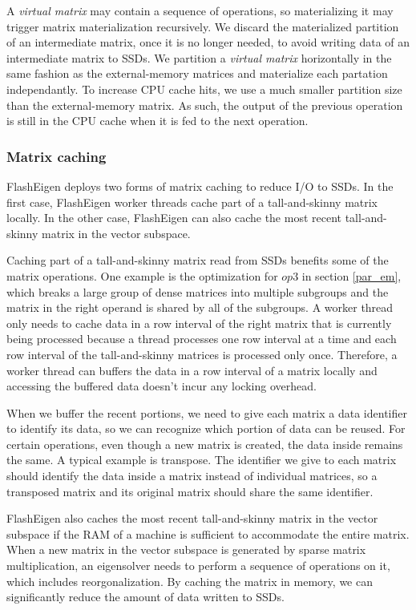 A \textit{virtual matrix} may contain a sequence of operations, so materializing
it may trigger matrix materialization recursively. We discard the materialized
partition of an intermediate matrix, once it is no longer needed, to avoid
writing data of an intermediate matrix to SSDs.
We partition a \textit{virtual matrix} horizontally in the same fashion as
the external-memory matrices and materialize each partation independantly. 
To increase CPU cache hits, we use a much smaller partition size than
the external-memory matrix. As such, the output of the previous operation is
still in the CPU cache when it is fed to the next operation.

\subsubsection{Matrix caching}
FlashEigen deploys two forms of matrix caching to reduce I/O to SSDs.
In the first case, FlashEigen worker threads cache part of a tall-and-skinny
matrix locally. In the other case, FlashEigen can also cache the most recent
tall-and-skinny matrix in the vector subspace.

Caching part of a tall-and-skinny matrix read from SSDs benefits some of
the matrix operations. One example is the optimization for $op3$ in section
\ref{par_em}, which breaks a large group of dense matrices into multiple
subgroups and the matrix in the right operand is shared by all of the subgroups.
A worker thread only needs to cache data in a row interval of the right matrix
that is currently being processed
because a thread processes one row interval at a time and each row interval of
the tall-and-skinny matrices is processed only once.
Therefore, a worker thread can buffers the data in a row interval of a matrix
locally and accessing the buffered data doesn't incur any locking overhead.

When we buffer the recent portions, we need to give each matrix a data identifier
to identify its data, so we can recognize which portion of data can be reused.
For certain operations, even though a new matrix is created, the data inside
remains the same. A typical example is transpose. The identifier we give to
each matrix should identify the data inside a matrix instead of individual matrices,
so a transposed matrix and its original matrix should share the same identifier.

FlashEigen also caches the most recent tall-and-skinny matrix in the vector
subspace if the RAM of a machine is sufficient to accommodate the entire matrix.
When a new matrix in the vector subspace is generated by sparse matrix
multiplication, an eigensolver needs to perform a sequence of operations on it,
which includes reorgonalization. By caching the matrix in memory, we can
significantly reduce the amount of data written to SSDs.
